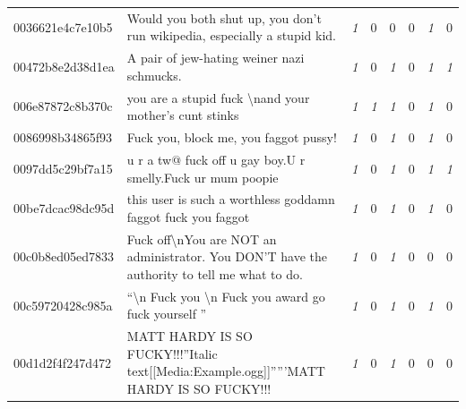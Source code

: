\begin{table}[htb!]
{\begin{minipage}{0.88\textheight}
\begin{threeparttable}
\begin{tabularx}{\textwidth}{L{0.95} L{6.25} C{0.135} C{0.135} C{0.135} C{0.135} C{0.135} C{0.135}}
                    0036621e4c7e10b5 & Would you both shut up, you don't run wikipedia, especially a stupid kid.                                                        & \textit{1}  & 0           & 0           & 0           & \textit{1}  & 0           \\
                    00472b8e2d38d1ea & A pair of jew-hating weiner nazi schmucks.                                                                                       & \textit{1}  & 0           & \textit{1}  & 0           & \textit{1}  & \textit{1}  \\
                    006e87872c8b370c & you are a stupid fuck \textbackslash nand your mother's cunt stinks                                                              & \textit{1}  & \textit{1}  & \textit{1}  & 0           & \textit{1}  & 0           \\
                    0086998b34865f93 & Fuck you, block me, you faggot pussy!                                                                                            & \textit{1}  & 0           & \textit{1}  & 0           & \textit{1}  & 0           \\
                    0097dd5c29bf7a15 & u r a tw@ fuck off u gay boy.U r smelly.Fuck ur mum poopie                                                                       & \textit{1}  & 0           & \textit{1}  & 0           & \textit{1}  & \textit{1}  \\
                    00be7dcac98dc95d & this user is such a worthless goddamn faggot fuck you faggot                                                                     & \textit{1}  & 0           & \textit{1}  & 0           & \textit{1}  & 0           \\
                    00c0b8ed05ed7833 & Fuck off\textbackslash nYou are NOT an administrator. You DON'T have the authority to tell me what to do.                        & \textit{1}  & 0           & \textit{1}  & 0           & 0           & 0           \\
                    00c59720428c985a & ``\textbackslash n Fuck you \textbackslash n Fuck you award go fuck yourself ''                                                  & \textit{1}  & 0           & \textit{1}  & 0           & \textit{1}  & 0           \\
                    00d1d2f4f247d472 & MATT HARDY IS SO FUCKY!!!''Italic text[[Media:Example.ogg]]'''''MATT HARDY IS SO FUCKY!!!                                        & \textit{1}  & 0           & \textit{1}  & 0           & 0           & 0           \\

\end{tabularx}
\end{threeparttable}
\end{minipage}}
\end{table}
